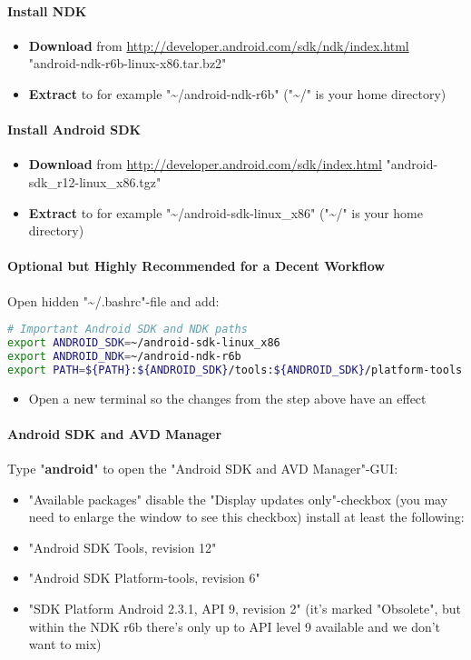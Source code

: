 \paragraph{Install \ac{NDK}}
\begin{itemize}
\item{\textbf{Download} from \url{http://developer.android.com/sdk/ndk/index.html} \textrightarrow{} "android-ndk-r6b-linux-x86.tar.bz2"}
\item{\textbf{Extract} to for example "\textasciitilde /android-ndk-r6b" ("\textasciitilde /" is your home directory)}
\end{itemize}



\paragraph{Install Android \ac{SDK}}
\begin{itemize}
\item{\textbf{Download} from \url{http://developer.android.com/sdk/index.html} \textrightarrow{} "android-sdk\_r12-linux\_x86.tgz"}
\item{\textbf{Extract} to for example "\textasciitilde /android-sdk-linux\_x86" ("\textasciitilde /" is your home directory)}
\end{itemize}


\paragraph{Optional but Highly Recommended for a Decent Workflow}
Open hidden "\textasciitilde /.bashrc"-file and add:
\begin{lstlisting}[language=sh]
# Important Android SDK and NDK paths
export ANDROID_SDK=~/android-sdk-linux_x86
export ANDROID_NDK=~/android-ndk-r6b
export PATH=${PATH}:${ANDROID_SDK}/tools:${ANDROID_SDK}/platform-tools:~/${ANDROID_NDK}
\end{lstlisting}
\begin{itemize}
\item{Open a new terminal so the changes from the step above have an effect}
\end{itemize}


\paragraph{Android \ac{SDK} and AVD Manager}
Type "\textbf{android}" to open the "Android SDK and AVD Manager"-\ac{GUI}:
\begin{itemize}
\item{"Available packages" \textrightarrow{} disable the "Display updates only"-checkbox (you may need to enlarge the window to see this checkbox) \textrightarrow{} install at least the following:}
\item{"Android SDK Tools, revision 12"}
\item{"Android SDK Platform-tools, revision 6"}
\item{"SDK Platform Android 2.3.1, \ac{API} 9, revision 2" (it's marked "Obsolete", but within the \ac{NDK} r6b there's only up to \ac{API} level 9 available and we don't want to mix)}
\end{itemize}




